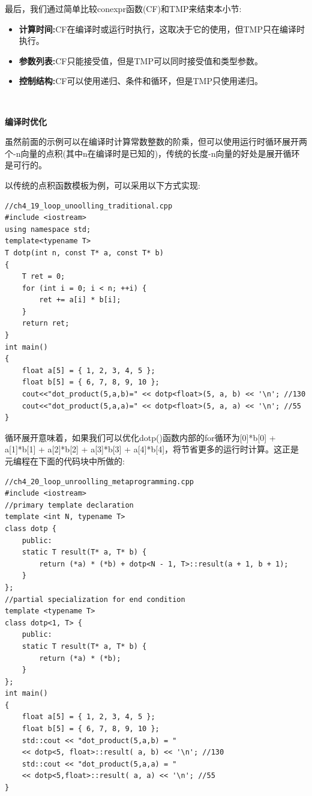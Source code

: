 最后，我们通过简单比较conexpr函数(CF)和TMP来结束本小节: \par

\begin{itemize}
	\item \textbf{计算时间:}CF在编译时或运行时执行，这取决于它的使用，但TMP只在编译时执行。
	\item \textbf{参数列表:}CF只能接受值，但是TMP可以同时接受值和类型参数。
	\item \textbf{控制结构:}CF可以使用递归、条件和循环，但是TMP只使用递归。
\end{itemize}

\noindent\textbf{}\ \par
\textbf{编译时优化} \ \par
虽然前面的示例可以在编译时计算常数整数的阶乘，但可以使用运行时循环展开两个-n向量的点积(其中n在编译时是已知的)，传统的长度-n向量的好处是展开循环是可行的。 \par
以传统的点积函数模板为例，可以采用以下方式实现: \par

\begin{lstlisting}[caption={}]
//ch4_19_loop_unoolling_traditional.cpp
#include <iostream>
using namespace std;
template<typename T>
T dotp(int n, const T* a, const T* b)
{
	T ret = 0;
	for (int i = 0; i < n; ++i) {
		ret += a[i] * b[i];
	}
	return ret;
}
int main()
{
	float a[5] = { 1, 2, 3, 4, 5 };
	float b[5] = { 6, 7, 8, 9, 10 };
	cout<<"dot_product(5,a,b)=" << dotp<float>(5, a, b) << '\n'; //130
	cout<<"dot_product(5,a,a)=" << dotp<float>(5, a, a) << '\n'; //55
}
\end{lstlisting}

循环展开意味着，如果我们可以优化dotp()函数内部的for循环为[0]*b[0] + a[1]*b[1] + a[2]*b[2] + a[3]*b[3] + a[4]*b[4]，将节省更多的运行时计算。这正是元编程在下面的代码块中所做的:\par

\begin{lstlisting}[caption={}]
//ch4_20_loop_unroolling_metaprogramming.cpp
#include <iostream>
//primary template declaration
template <int N, typename T>
class dotp {
	public:
	static T result(T* a, T* b) {
		return (*a) * (*b) + dotp<N - 1, T>::result(a + 1, b + 1);
	}
};
//partial specialization for end condition
template <typename T>
class dotp<1, T> {
	public:
	static T result(T* a, T* b) {
		return (*a) * (*b);
	}
};
int main()
{
	float a[5] = { 1, 2, 3, 4, 5 };
	float b[5] = { 6, 7, 8, 9, 10 };
	std::cout << "dot_product(5,a,b) = "
	<< dotp<5, float>::result( a, b) << '\n'; //130
	std::cout << "dot_product(5,a,a) = "
	<< dotp<5,float>::result( a, a) << '\n'; //55
}
\end{lstlisting}

